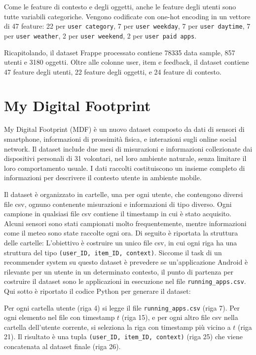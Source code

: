 \documentclass[12pt,italian]{report}
\begin{document}
\bigskip \noindent
Come le feature di contesto e degli oggetti, anche le feature degli utenti sono tutte variabili categoriche. Vengono codificate con one-hot encoding in un vettore di 47 feature: 22 per \texttt{user category}, 7 per \texttt{user weekday}, 7 per \texttt{user daytime}, 7 per \texttt{user weather}, 2 per \texttt{user weekend}, 2 per \texttt{user paid apps}.

Ricapitolando, il dataset Frappe processato contiene 78335 data sample, 857 utenti e 3180 oggetti. Oltre alle colonne user, item e feedback, il dataset contiene 47 feature degli utenti, 22 feature degli oggetti, e 24 feature di contesto.

\section{My Digital Footprint}
My Digital Footprint (MDF) \cite{mdf} è un nuovo dataset composto da dati di sensori di smartphone, informazioni di prossimità fisica, e interazioni sugli online social network. Il dataset include due mesi di misurazioni e informazioni collezionate dai dispositivi personali di 31 volontari, nel loro ambiente naturale, senza limitare il loro comportamento usuale. I dati raccolti costituiscono un insieme completo di informazioni per descrivere il contesto utente in ambiente mobile. 

Il dataset è organizzato in cartelle, una per ogni utente, che contengono diversi file csv, ognuno contenente misurazioni e informazioni di tipo diverso. Ogni campione in qualsiasi file csv contiene il timestamp in cui è stato acquisito. Alcuni sensori sono stati campionati molto frequentemente, mentre informazioni come il meteo sono state raccolte ogni ora.
Di seguito è riportata la struttura delle cartelle:
\noindent
L'obiettivo è costruire un unico file csv, in cui ogni riga ha una struttura del tipo \texttt{(user\_ID, item\_ID, context)}. Siccome il task di un recommender system su questo dataset è prevedere se un'applicazione Android è rilevante per un utente in un determinato contesto, il punto di partenza per costruire il dataset sono le applicazioni in esecuzione nel file \texttt{running\_apps.csv}. Qui sotto è riportato il codice Python per generare il dataset: 

Per ogni cartella utente (riga 4) si legge il file \texttt{running\_apps.csv} (riga 7). Per ogni elemento nel file con timestamp $t$ (riga 15), e per ogni altro file csv nella cartella dell'utente corrente, si seleziona la riga con timestamp più vicino a $t$ (riga 21). Il risultato è una tupla \texttt{(user\_ID, item\_ID, context)} (riga 25) che viene concatenata al dataset finale (riga 26).
\end{document}
